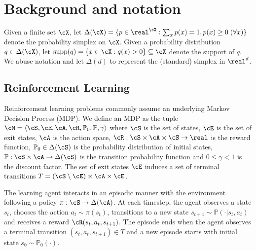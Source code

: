 \section{Background and notation}
Given a finite set $\cX$, let $\Delta(\cX)=\{p\in\real^\cX:\sum_x p(x)=1,\linebreak p(x)\geq 0\;(\forall x)\}$ denote the probability simplex on $\cX$. Given a probability distribution $q\in\Delta(\cX)$, let $\mathrm{supp}(q)=\{x\in\cX:q(x) > 0\}\subseteq\cX$ denote the support of $q$. We abuse notation and let $\Delta(d)$ to represent the (standard) simplex in $\real^d$.

\subsection{Reinforcement Learning}
Reinforcement learning problems commonly assume an underlying Markov Decision Process (MDP). We define an MDP as the tuple $\cM = \langle\cS,\cE,\cA,\cR,\mathbb{P}_0, \mathbb{P},\gamma\rangle$ where $\cS$ is the set of states, $\cE$ is the set of exit states, $\cA$ is the action space, $\cR:\cS\times\cA\times\cS\rightarrow\real$ is the reward function, $\mathbb{P}_0 \in \Delta(\cS)$ is the probability distribution of initial states, $\mathbb{P}:\cS\times\cA\to\Delta(\cS)$ is the transition probability function and $0\leq\gamma<1$ is the discount factor. The set of exit states $\cE$ induces a set of terminal transitions $T = (\cS\setminus\cE)\times\cA\times\cE$.

The learning agent interacts in an episodic manner with the environment following a policy $\pi:\cS\rightarrow\Delta(\cA)$. At each timestep, the agent observes a state $s_t$, chooses the action $a_t\sim\pi(s_t)$, transitions to a new state $s_{t+1}\sim\mathbb{P}(\cdot\lvert s_t, a_t)$ and receives a reward $\cR(s_t, a_t, s_{t+1})$. The episode ends when the agent observes a terminal transition $(s_t, a_t, s_{t+1})\in T$ and a new episode starts with initial state $s_0\sim\mathbb{P}_0(\cdot)$.

